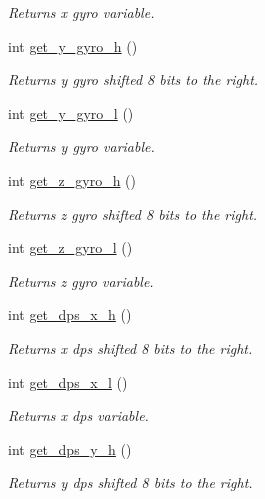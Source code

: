 \begin{DoxyCompactItemize}
\begin{DoxyCompactList}\small\item\em Returns x gyro variable. \end{DoxyCompactList}\item 
int \hyperlink{classl3g4200_a6c4d995bc9be83ae30d884d0dec95960}{get\+\_\+y\+\_\+gyro\+\_\+h} ()
\begin{DoxyCompactList}\small\item\em Returns y gyro shifted 8 bits to the right. \end{DoxyCompactList}\item 
int \hyperlink{classl3g4200_afb369dc33500b9ef4d32a1f35c066448}{get\+\_\+y\+\_\+gyro\+\_\+l} ()
\begin{DoxyCompactList}\small\item\em Returns y gyro variable. \end{DoxyCompactList}\item 
int \hyperlink{classl3g4200_a48ea66d624cf6147656e65b5ba0e3314}{get\+\_\+z\+\_\+gyro\+\_\+h} ()
\begin{DoxyCompactList}\small\item\em Returns z gyro shifted 8 bits to the right. \end{DoxyCompactList}\item 
int \hyperlink{classl3g4200_a6050692b28be5dd532ed91e346545ca3}{get\+\_\+z\+\_\+gyro\+\_\+l} ()
\begin{DoxyCompactList}\small\item\em Returns z gyro variable. \end{DoxyCompactList}\item 
int \hyperlink{classl3g4200_a5182e240887b44c1178576092a61f5fd}{get\+\_\+dps\+\_\+x\+\_\+h} ()
\begin{DoxyCompactList}\small\item\em Returns x dps shifted 8 bits to the right. \end{DoxyCompactList}\item 
int \hyperlink{classl3g4200_a0c96f1bc6aabb4a5bb4652d3ae703821}{get\+\_\+dps\+\_\+x\+\_\+l} ()
\begin{DoxyCompactList}\small\item\em Returns x dps variable. \end{DoxyCompactList}\item 
int \hyperlink{classl3g4200_a46b55512661be401f9a6b7cb7c87b4a1}{get\+\_\+dps\+\_\+y\+\_\+h} ()
\begin{DoxyCompactList}\small\item\em Returns y dps shifted 8 bits to the right. \end{DoxyCompactList}\item 

\end{DoxyCompactItemize}

